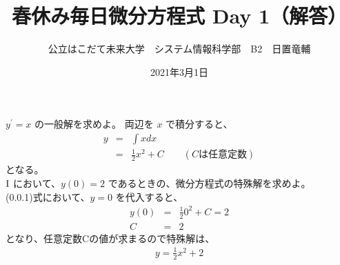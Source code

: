\documentclass[dvipdfmx,uplatex]{jsarticle}
\title{春休み毎日微分方程式 Day 1（解答）}
\author{公立はこだて未来大学　システム情報科学部　B2　日置竜輔}
\date{2021年3月1日}
\begin{document}
\maketitle

\begin{qparts}
    \qpart $ y ^ {\prime} = x $ の一般解を求めよ。
    両辺を $ x $ で積分すると、\\
    \begin{eqnarray}
      y & = & \int x dx \nonumber \\
      & = & \frac{1}{2} x ^ 2 + C \qquad (Cは任意定数)
    \end{eqnarray}
    となる。\\

    \qpart $ \rm I $ において、$ y(0) = 2 $ であるときの、微分方程式の特殊解を求めよ。\\
    (0.0.1)式において、$ y = 0 $ を代入すると、
    \begin{eqnarray}
      y(0) & = & \frac{1}{2} 0 ^ 2 + C = 2 \nonumber \\
      C & = & 2 \nonumber
    \end{eqnarray}
    となり、任意定数Cの値が求まるので特殊解は、
    \begin{align*}
      y = \frac{1}{2} x ^ 2 + 2
    \end{align*}
\end{qparts}
\end{document}
